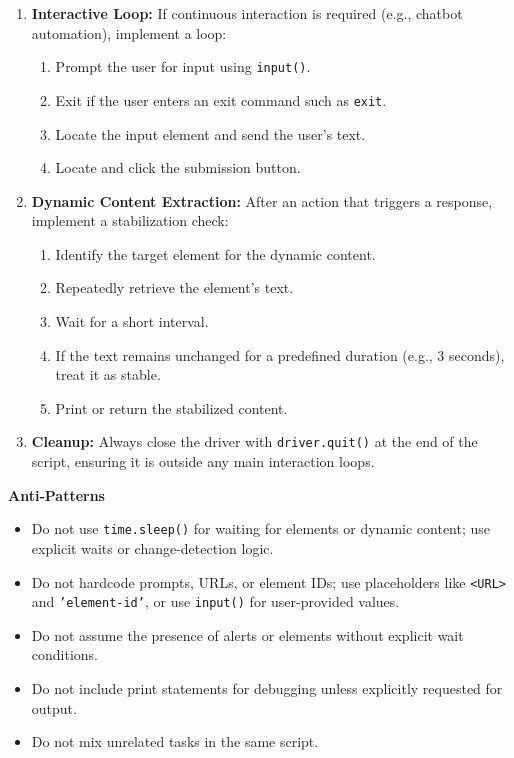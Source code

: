 \begin{tcolorbox}
\begin{tcolorbox}[
  enhanced,
  breakable,
  colback=white,
  colframe=skillborder,
  boxrule=0.6pt,
  arc=1.5mm,
  title=\textbf{Prompt},
  colbacktitle=black!5,
  coltitle=black
]
\begin{enumerate}[leftmargin=2em, itemsep=0.4em]
    \item \textbf{Interactive Loop:} If continuous interaction is required (e.g., chatbot automation), implement a loop:
    \begin{enumerate}[leftmargin=2em, itemsep=0.2em]
        \item Prompt the user for input using \texttt{input()}.
        \item Exit if the user enters an exit command such as \texttt{exit}.
        \item Locate the input element and send the user's text.
        \item Locate and click the submission button.
    \end{enumerate}
    
    \item \textbf{Dynamic Content Extraction:} After an action that triggers a response, implement a stabilization check:
    \begin{enumerate}[leftmargin=2em, itemsep=0.2em]
        \item Identify the target element for the dynamic content.
        \item Repeatedly retrieve the element's text.
        \item Wait for a short interval.
        \item If the text remains unchanged for a predefined duration (e.g., 3 seconds), treat it as stable.
        \item Print or return the stabilized content.
    \end{enumerate}
    
    \item \textbf{Cleanup:} Always close the driver with \texttt{driver.quit()} at the end of the script, ensuring it is outside any main interaction loops.
\end{enumerate}

\textbf{Anti-Patterns}
\begin{itemize}[leftmargin=1.8em, itemsep=0.3em]
    \item Do not use \texttt{time.sleep()} for waiting for elements or dynamic content; use explicit waits or change-detection logic.
    \item Do not hardcode prompts, URLs, or element IDs; use placeholders like \texttt{<URL>} and \texttt{'element-id'}, or use \texttt{input()} for user-provided values.
    \item Do not assume the presence of alerts or elements without explicit wait conditions.
    \item Do not include print statements for debugging unless explicitly requested for output.
    \item Do not mix unrelated tasks in the same script.
\end{itemize}

\end{tcolorbox}

\end{tcolorbox}